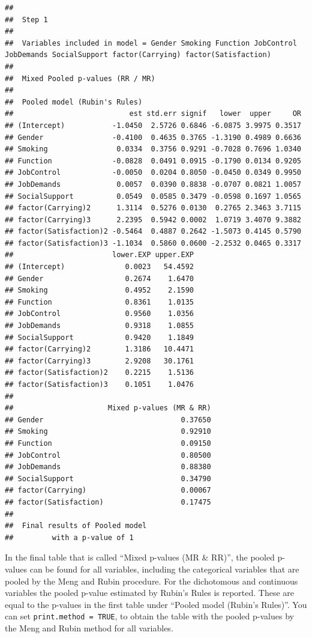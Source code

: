 \documentclass[]{book}
\begin{document}
\begin{verbatim}
## 
##  Step 1 
## 
##  Variables included in model = Gender Smoking Function JobControl JobDemands SocialSupport factor(Carrying) factor(Satisfaction) 
## 
##  Mixed Pooled p-values (RR / MR) 
## 
##  Pooled model (Rubin's Rules) 
##                           est std.err signif   lower  upper     OR
## (Intercept)           -1.0450  2.5726 0.6846 -6.0875 3.9975 0.3517
## Gender                -0.4100  0.4635 0.3765 -1.3190 0.4989 0.6636
## Smoking                0.0334  0.3756 0.9291 -0.7028 0.7696 1.0340
## Function              -0.0828  0.0491 0.0915 -0.1790 0.0134 0.9205
## JobControl            -0.0050  0.0204 0.8050 -0.0450 0.0349 0.9950
## JobDemands             0.0057  0.0390 0.8838 -0.0707 0.0821 1.0057
## SocialSupport          0.0549  0.0585 0.3479 -0.0598 0.1697 1.0565
## factor(Carrying)2      1.3114  0.5276 0.0130  0.2765 2.3463 3.7115
## factor(Carrying)3      2.2395  0.5942 0.0002  1.0719 3.4070 9.3882
## factor(Satisfaction)2 -0.5464  0.4887 0.2642 -1.5073 0.4145 0.5790
## factor(Satisfaction)3 -1.1034  0.5860 0.0600 -2.2532 0.0465 0.3317
##                       lower.EXP upper.EXP
## (Intercept)              0.0023   54.4592
## Gender                   0.2674    1.6470
## Smoking                  0.4952    2.1590
## Function                 0.8361    1.0135
## JobControl               0.9560    1.0356
## JobDemands               0.9318    1.0855
## SocialSupport            0.9420    1.1849
## factor(Carrying)2        1.3186   10.4471
## factor(Carrying)3        2.9208   30.1761
## factor(Satisfaction)2    0.2215    1.5136
## factor(Satisfaction)3    0.1051    1.0476
## 
##                      Mixed p-values (MR & RR)
## Gender                                0.37650
## Smoking                               0.92910
## Function                              0.09150
## JobControl                            0.80500
## JobDemands                            0.88380
## SocialSupport                         0.34790
## factor(Carrying)                      0.00067
## factor(Satisfaction)                  0.17475
## 
##  Final results of Pooled model
##         with a p-value of 1
\end{verbatim}

In the final table that is called ``Mixed p-values (MR \& RR)'', the
pooled p-values can be found for all variables, including the
categorical variables that are pooled by the Meng and Rubin procedure.
For the dichotomous and continuous variables the pooled p-value
estimated by Rubin's Rules is reported. These are equal to the p-values
in the first table under ``Pooled model (Rubin's Rules)''. You can set
\texttt{print.method\ =\ TRUE}, to obtain the table with the pooled
p-values by the Meng and Rubin method for all variables.
\end{document}
